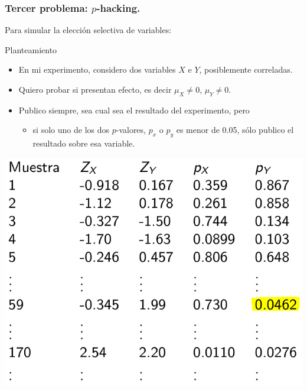 \documentclass[9pt]{beamer}
\begin{document}
\begin{frame}
  \frametitle{Tercer problema: $p$-hacking.}
  Para simular la elección selectiva de variables:\\ 
  \begin{block}{Planteamiento}
    \begin{itemize}
    \item     En mi experimento, considero dos variables $X$ e $Y$,
      posiblemente correladas.
    \item Quiero probar si presentan efecto, es decir $\mu_X \neq 0$,
      $\mu_Y\neq 0$.
    \item   Publico siempre, sea cual sea el resultado del
      experimento, pero
      \begin{itemize}
      \item si solo uno de los dos $p$-valores, $p_x$ o $p_y$ es menor
        de 0.05, sólo publico el resultado sobre esa variable.
      \end{itemize}
    \end{itemize}

  \end{block}
  \begin{center}
    \includegraphics[width=0.5\linewidth]{images/select_variable-2}
  \end{center}
\end{frame}
\end{document}
